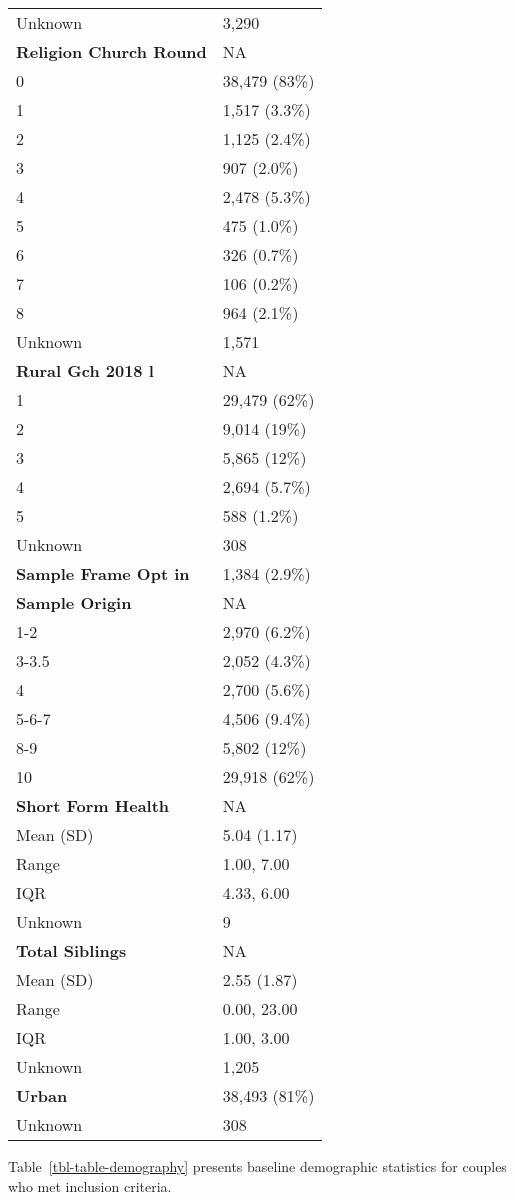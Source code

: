 \documentclass[
  single column]{article}
\begin{document}
\begin{longtable}[]{@{}ll@{}}
Unknown & 3,290 \\
\textbf{Religion Church Round} & NA \\
0 & 38,479 (83\%) \\
1 & 1,517 (3.3\%) \\
2 & 1,125 (2.4\%) \\
3 & 907 (2.0\%) \\
4 & 2,478 (5.3\%) \\
5 & 475 (1.0\%) \\
6 & 326 (0.7\%) \\
7 & 106 (0.2\%) \\
8 & 964 (2.1\%) \\
Unknown & 1,571 \\
\textbf{Rural Gch 2018 l} & NA \\
1 & 29,479 (62\%) \\
2 & 9,014 (19\%) \\
3 & 5,865 (12\%) \\
4 & 2,694 (5.7\%) \\
5 & 588 (1.2\%) \\
Unknown & 308 \\
\textbf{Sample Frame Opt in} & 1,384 (2.9\%) \\
\textbf{Sample Origin} & NA \\
1-2 & 2,970 (6.2\%) \\
3-3.5 & 2,052 (4.3\%) \\
4 & 2,700 (5.6\%) \\
5-6-7 & 4,506 (9.4\%) \\
8-9 & 5,802 (12\%) \\
10 & 29,918 (62\%) \\
\textbf{Short Form Health} & NA \\
Mean (SD) & 5.04 (1.17) \\
Range & 1.00, 7.00 \\
IQR & 4.33, 6.00 \\
Unknown & 9 \\
\textbf{Total Siblings} & NA \\
Mean (SD) & 2.55 (1.87) \\
Range & 0.00, 23.00 \\
IQR & 1.00, 3.00 \\
Unknown & 1,205 \\
\textbf{Urban} & 38,493 (81\%) \\
Unknown & 308 \\
\end{longtable}

Table~\ref{tbl-table-demography} presents baseline demographic
statistics for couples who met inclusion criteria.
\end{document}
